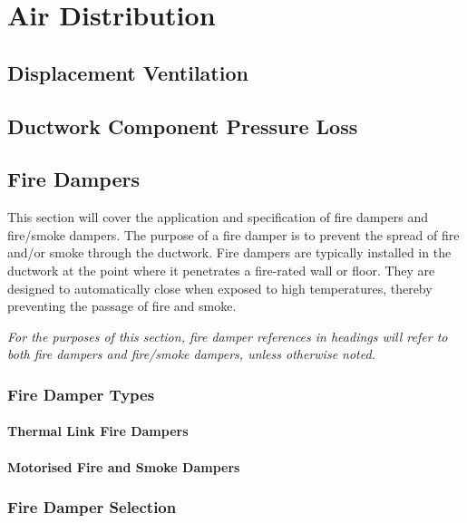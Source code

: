 \chapter{Air Distribution}
\label{chp:AirDistribution}

\section{Displacement Ventilation}
\label{sec:DisplacementVent}

\section{Ductwork Component Pressure Loss}
\label{sec:DuctworkComponentdP}

\section{Fire Dampers}
\label{sec:FireDampers}

This section will cover the application and specification of fire dampers and fire/smoke dampers.  The purpose of a fire damper is to prevent the spread of fire and/or smoke through the ductwork.  Fire dampers are typically installed in the ductwork at the point where it penetrates a fire-rated wall or floor.  They are designed to automatically close when exposed to high temperatures, thereby preventing the passage of fire and smoke.

\textit{For the purposes of this section, fire damper references in headings will refer to both fire dampers and fire/smoke dampers, unless otherwise noted.}

\subsection{Fire Damper Types}



\subsubsection{Thermal Link Fire Dampers}



\subsubsection{Motorised Fire and Smoke Dampers}



\subsection{Fire Damper Selection}

